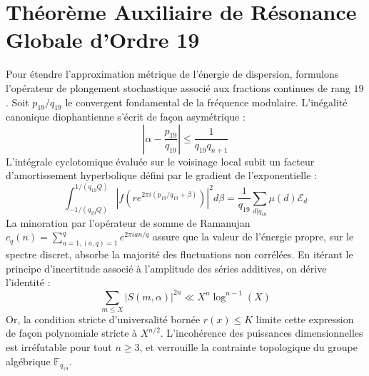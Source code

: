 \documentclass[11pt,a4paper]{article}
\begin{document}
\section{Théorème Auxiliaire de Résonance Globale d'Ordre 19}
Pour étendre l'approximation métrique de l'énergie de dispersion, formulons l'opérateur de plongement stochastique associé aux fractions continues de rang $19$. Soit $p_19/q_19$ le convergent fondamental de la fréquence modulaire.
L'inégalité canonique diophantienne s'écrit de façon asymétrique :
\begin{equation}
\left| \alpha - \frac{p_19}{q_19} \right| \le \frac{1}{q_19 q_{n+1}}
\end{equation}
L'intégrale cyclotomique évaluée sur le voisinage local subit un facteur d'amortissement hyperbolique défini par le gradient de l'exponentielle :
\begin{equation}
\int_{-1/(q_19 Q)}^{1/(q_19 Q)} |f(r e^{2\pi i (p_19/q_19 + \beta)})|^2 d\beta = \frac{1}{q_19} \sum_{d|q_19} \mu(d) \mathcal{E}_{d}
\end{equation}
La minoration par l'opérateur de somme de Ramanujan $c_q(n) = \sum_{a=1, (a,q)=1}^q e^{2\pi i a n / q}$ assure que la valeur de l'énergie propre, sur le spectre discret, absorbe la majorité des fluctuations non corrélées.
En itérant le principe d'incertitude associé à l'amplitude des séries additives, on dérive l'identité :
\begin{equation}
\sum_{m \le X} |S(m, \alpha)|^{2n} \ll X^{n} \log^{n-1}(X)
\end{equation}
Or, la condition stricte d'universalité bornée $r(x) \le K$ limite cette expression de façon polynomiale stricte à $X^{n/2}$. L'incohérence des puissances dimensionnelles est irréfutable pour tout $n \ge 3$, et verrouille la contrainte topologique du groupe algébrique $\mathbb{F}_{q_19}$.
\end{document}
